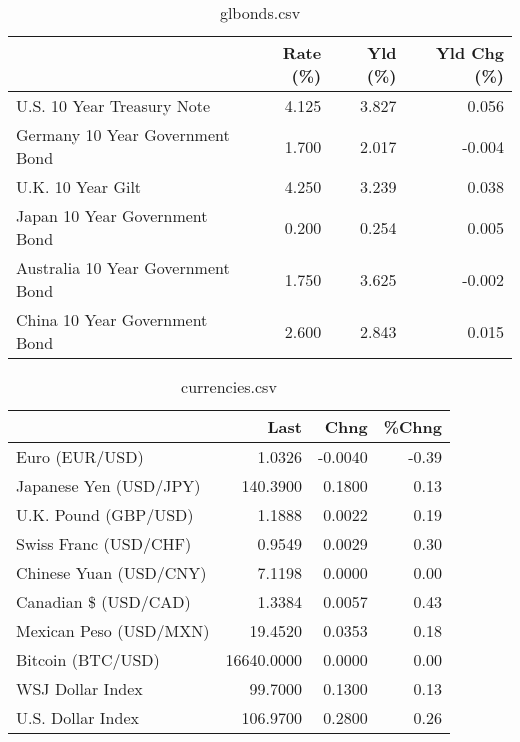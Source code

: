 \documentclass{article}%
\begin{document}
%


\begin{table}[htbp]%
\caption{glbonds.csv}%
\centering%
\begin{adjustbox}{width=1\textwidth}%
\begin{tabular}{lrrr}
\toprule
                                  &  Rate (\%) &  Yld (\%) &  Yld Chg (\%) \\
\midrule
       U.S. 10 Year Treasury Note &     4.125 &    3.827 &        0.056 \\
  Germany 10 Year Government Bond &     1.700 &    2.017 &       -0.004 \\
                U.K. 10 Year Gilt &     4.250 &    3.239 &        0.038 \\
    Japan 10 Year Government Bond &     0.200 &    0.254 &        0.005 \\
Australia 10 Year Government Bond &     1.750 &    3.625 &       -0.002 \\
    China 10 Year Government Bond &     2.600 &    2.843 &        0.015 \\
\bottomrule
\end{tabular}
%
\end{adjustbox}%
\end{table}

%


\begin{table}[htbp]%
\caption{currencies.csv}%
\centering%
\begin{adjustbox}{width=1\textwidth}%
\begin{tabular}{lrrr}
\toprule
                       &       Last &    Chng &  \%Chng \\
\midrule
        Euro (EUR/USD) &     1.0326 & -0.0040 &  -0.39 \\
Japanese Yen (USD/JPY) &   140.3900 &  0.1800 &   0.13 \\
  U.K. Pound (GBP/USD) &     1.1888 &  0.0022 &   0.19 \\
 Swiss Franc (USD/CHF) &     0.9549 &  0.0029 &   0.30 \\
Chinese Yuan (USD/CNY) &     7.1198 &  0.0000 &   0.00 \\
  Canadian \$ (USD/CAD) &     1.3384 &  0.0057 &   0.43 \\
Mexican Peso (USD/MXN) &    19.4520 &  0.0353 &   0.18 \\
     Bitcoin (BTC/USD) & 16640.0000 &  0.0000 &   0.00 \\
      WSJ Dollar Index &    99.7000 &  0.1300 &   0.13 \\
     U.S. Dollar Index &   106.9700 &  0.2800 &   0.26 \\
\bottomrule
\end{tabular}
%
\end{adjustbox}%
\end{table}

%
\end{document}
